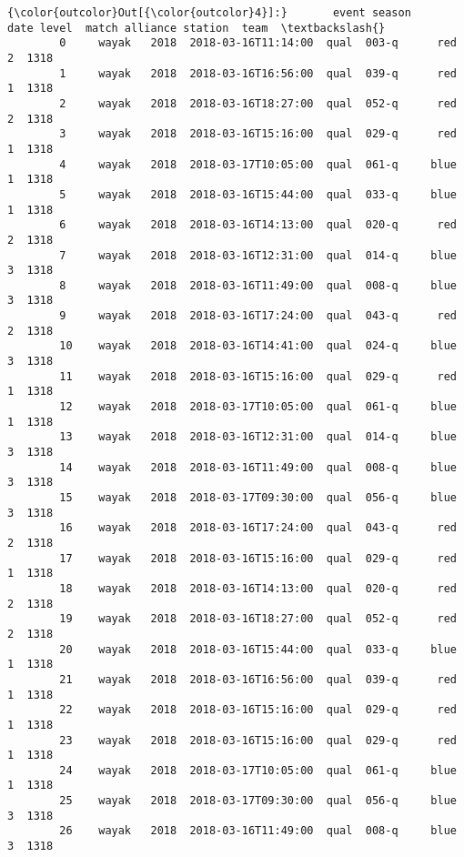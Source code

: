 \documentclass[11pt]{article}
\begin{document}
\begin{Verbatim}[commandchars=\\\{\}]
{\color{outcolor}Out[{\color{outcolor}4}]:}       event season                 date level  match alliance station  team  \textbackslash{}
        0     wayak   2018  2018-03-16T11:14:00  qual  003-q      red       2  1318   
        1     wayak   2018  2018-03-16T16:56:00  qual  039-q      red       1  1318   
        2     wayak   2018  2018-03-16T18:27:00  qual  052-q      red       2  1318   
        3     wayak   2018  2018-03-16T15:16:00  qual  029-q      red       1  1318   
        4     wayak   2018  2018-03-17T10:05:00  qual  061-q     blue       1  1318   
        5     wayak   2018  2018-03-16T15:44:00  qual  033-q     blue       1  1318   
        6     wayak   2018  2018-03-16T14:13:00  qual  020-q      red       2  1318   
        7     wayak   2018  2018-03-16T12:31:00  qual  014-q     blue       3  1318   
        8     wayak   2018  2018-03-16T11:49:00  qual  008-q     blue       3  1318   
        9     wayak   2018  2018-03-16T17:24:00  qual  043-q      red       2  1318   
        10    wayak   2018  2018-03-16T14:41:00  qual  024-q     blue       3  1318   
        11    wayak   2018  2018-03-16T15:16:00  qual  029-q      red       1  1318   
        12    wayak   2018  2018-03-17T10:05:00  qual  061-q     blue       1  1318   
        13    wayak   2018  2018-03-16T12:31:00  qual  014-q     blue       3  1318   
        14    wayak   2018  2018-03-16T11:49:00  qual  008-q     blue       3  1318   
        15    wayak   2018  2018-03-17T09:30:00  qual  056-q     blue       3  1318   
        16    wayak   2018  2018-03-16T17:24:00  qual  043-q      red       2  1318   
        17    wayak   2018  2018-03-16T15:16:00  qual  029-q      red       1  1318   
        18    wayak   2018  2018-03-16T14:13:00  qual  020-q      red       2  1318   
        19    wayak   2018  2018-03-16T18:27:00  qual  052-q      red       2  1318   
        20    wayak   2018  2018-03-16T15:44:00  qual  033-q     blue       1  1318   
        21    wayak   2018  2018-03-16T16:56:00  qual  039-q      red       1  1318   
        22    wayak   2018  2018-03-16T15:16:00  qual  029-q      red       1  1318   
        23    wayak   2018  2018-03-16T15:16:00  qual  029-q      red       1  1318   
        24    wayak   2018  2018-03-17T10:05:00  qual  061-q     blue       1  1318   
        25    wayak   2018  2018-03-17T09:30:00  qual  056-q     blue       3  1318   
        26    wayak   2018  2018-03-16T11:49:00  qual  008-q     blue       3  1318   

\end{Verbatim}
\end{document}
